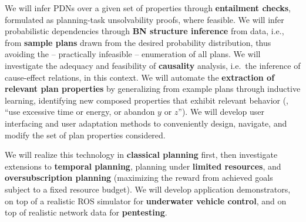 We will infer PDNs over a given set of properties through
\textbf{entailment checks}, formulated as planning-task unsolvability
proofs, where feasible. We will infer probabilistic dependencies
through \textbf{BN structure inference} from data, i.e., from
\textbf{sample plans} drawn from the desired probability distribution,
thus avoiding the -- practically infeasible -- enumeration of all
plans.
We will investigate the adequacy and feasibility of \textbf{causality}
analysis, i.e.\ the inference of cause-effect relations, in this
context. We will automate the \textbf{extraction of relevant plan
  properties} by generalizing from example plans through inductive
learning, identifying new composed properties that exhibit relevant
behavior (\eg, ``use excessive time or energy, or abandon $y$ or
$z$'').
We will develop user interfacing and user adaptation methods to
conveniently design, navigate, and modify the set of plan properties
considered.

We will realize this technology in \textbf{classical planning} first,
then investigate extensions to \textbf{temporal planning}, planning
under \textbf{limited resources}, and \textbf{oversubscription
  planning} (maximizing the reward from achieved goals subject to a
fixed resource budget). We will develop application demonstrators, on
top of a realistic ROS simulator for \textbf{underwater vehicle
  control}, and on top of realistic network data for
\textbf{pentesting}.

